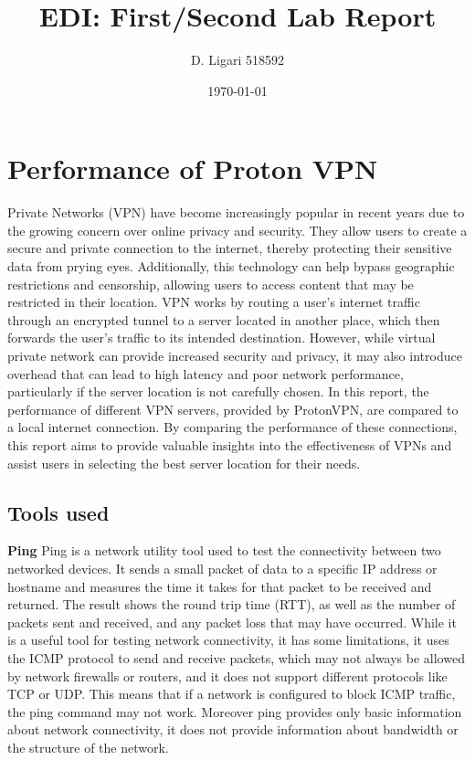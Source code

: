 \documentclass[eng]{class}
\title{EDI: First/Second Lab Report}
\author[1]{D. Ligari 518592}
\affil[1]{University of Pavia, Department of Computer Engineering (Data Science), Pavia, Italy}
\date{\today}
\begin{document}
\maketitle
\tableofcontents
\thispagestyle{FirstPage}
\vspace{\baselineskip}
\section{Performance of Proton VPN}
 Private Networks (VPN) have become increasingly popular in recent years due to the growing concern over online privacy and security.
They allow users to create a secure and private connection to the internet, thereby protecting their sensitive data from prying eyes.
Additionally, this technology can help bypass geographic restrictions and censorship, allowing users to access content that may be restricted in their location.
VPN works by routing a user's internet traffic through an encrypted tunnel to a server located in another place,
which then forwards the user's traffic to its intended destination.
However, while virtual private network can provide increased security and privacy, it may also introduce overhead
that can lead to high latency and poor network performance, particularly if the server location is not carefully chosen.
In this report, the performance of different VPN servers, provided by ProtonVPN, are compared to a local internet connection.
By comparing the performance of these connections, this report aims to provide valuable insights into the effectiveness of VPNs and assist users in selecting the best server location for their needs.
\subsection{Tools used}
\textbf{Ping} \newline
Ping is a network utility tool used to test the connectivity between two networked devices.
It sends a small packet of data to a specific IP address or hostname and measures the time it takes for that packet to be received and returned.
The result shows the round trip time (RTT), as well as the number of packets sent and received, and any packet loss that may have occurred.\newline
While it is a useful tool for testing network connectivity, it has some limitations,
it uses the ICMP protocol to send and receive packets, which may not always be allowed by network firewalls or routers, and it does not support different protocols like TCP or UDP.
This means that if a network is configured to block ICMP traffic, the ping command may not work.
Moreover ping provides only basic information about network connectivity, it does not provide information about bandwidth or the structure of the network.\newline
\newline
\pagestyle{OtherPage}
\end{document}
